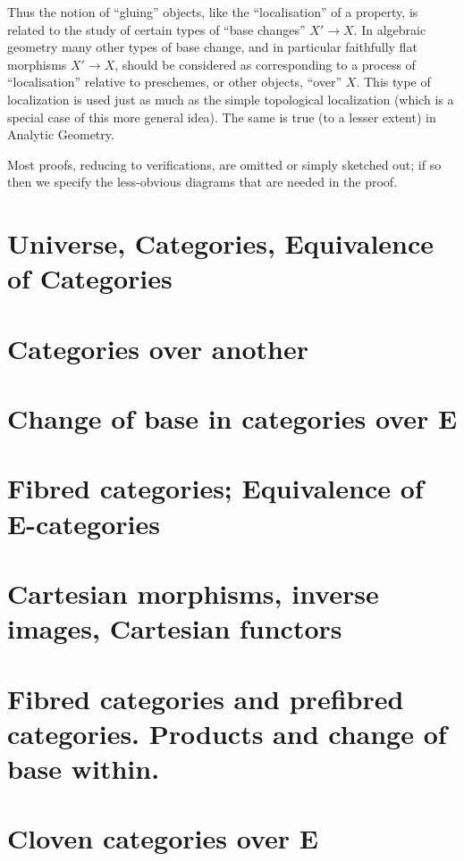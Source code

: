 Thus the notion of ``gluing'' objects, like the ``localisation'' of a property, is related to the study of certain types of ``base changes'' $X '\to X$. 
In algebraic geometry many other types of base change, and in particular faithfully flat morphisms $X '\to X$, should be considered as corresponding to a process of ``localisation'' relative to preschemes, or other objects, ``over'' $X$.
This type of localization is used just as much as the simple topological localization (which is a special case of this more general idea). 
The same is true (to a lesser extent) in Analytic Geometry. 

Most proofs, reducing to verifications, are omitted or simply sketched out; if so then we specify the less-obvious diagrams that are needed in the proof.

\section{Universe, Categories, Equivalence of Categories}

\section{Categories over another}

\section{Change of base in categories over E}

\section{Fibred categories; Equivalence of E-categories}

\section{Cartesian morphisms, inverse images, Cartesian functors}

\section{Fibred categories and prefibred categories. Products and change of base within.}

\section{Cloven categories over E}

